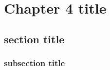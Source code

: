 \chapter{Chapter 4 title}
\ifpdf
    \graphicspath{{Chapter4/Chapter4Figs/PNG/}{Chapter4/Chapter4Figs/PDF/}{Chapter4/Chapter4Figs/}}
\else
    \graphicspath{{Chapter4/Chapter4Figs/EPS/}{Chapter4/Chapter4Figs/}}
\fi



\section{section title}
\subsection{subsection title}

